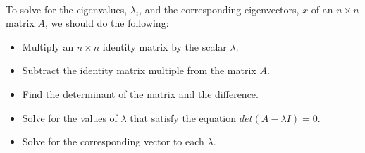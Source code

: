 \documentclass[fleqn]{article}
\begin{document}
\begin{enumerate}
\begin{itemize}
          \textcolor{hwColor}{
            \\
            To solve for the eigenvalues, $\lambda_i$, and the corresponding eigenvectors, $x$ of an $n \times n$ matrix 
            $A$, we should do the following: 
            \\
            \begin{itemize}
              \item Multiply an $n \times n$ identity matrix by the scalar $\lambda$.
              \item Subtract the identity matrix multiple from the matrix $A$.
              \item Find the determinant of the matrix and the difference.
              \item Solve for the values of $\lambda$ that satisfy the equation $det\left(A-\lambda I\right)=0$.
              \item Solve for the corresponding vector to each $\lambda$.
            \end{itemize}
          }


\end{itemize}
\end{enumerate}
\end{document}
